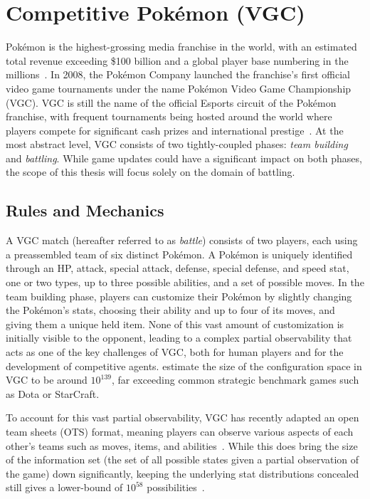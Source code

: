 \section{Competitive Pokémon (VGC)} \label{sec:vgc}
Pokémon is the highest-grossing media franchise in the world, with an estimated total revenue exceeding \$100 billion and a global player base numbering in the millions~\cite{angliss2025vgc}.
In 2008, the Pokémon Company launched the franchise's first official video game tournaments under the name Pokémon Video Game Championship (VGC).
VGC is still the name of the official Esports circuit of the Pokémon franchise, with frequent tournaments being hosted around the world where players compete for significant cash prizes and international prestige~\cite{angliss2025vgc,vgc-rules-regulations}.
At the most abstract level, VGC consists of two tightly-coupled phases: \textit{team building} and \textit{battling}.
While game updates could have a significant impact on both phases, the scope of this thesis will focus solely on the domain of battling.

\subsection{Rules and Mechanics} \label{sec:vgc:mechanics}
A VGC match (hereafter referred to as \textit{battle}) consists of two players, each using a preassembled team of six distinct Pokémon.
A Pokémon is uniquely identified through an HP, attack, special attack, defense, special defense, and speed stat, one or two types, up to three possible abilities, and a set of possible moves.
In the team building phase, players can customize their Pokémon by slightly changing the Pokémon's stats, choosing their ability and up to four of its moves, and giving them a unique held item.
None of this vast amount of customization is initially visible to the opponent, leading to a complex partial observability that acts as one of the key challenges of VGC, both for human players and for the development of competitive agents.
\textcite{angliss2025vgc} estimate the size of the configuration space in VGC to be around $10^{139}$, far exceeding common strategic benchmark games such as Dota or StarCraft.

To account for this vast partial observability, VGC has recently adapted an open team sheets (OTS) format, meaning players can observe various aspects of each other's teams such as moves, items, and abilities~\cite{vgc-rules-regulations}.
While this does bring the size of the information set (the set of all possible states given a partial observation of the game) down significantly, keeping the underlying stat distributions concealed still gives a lower-bound of $10^{58}$ possibilities~\cite{angliss2025vgc}.

